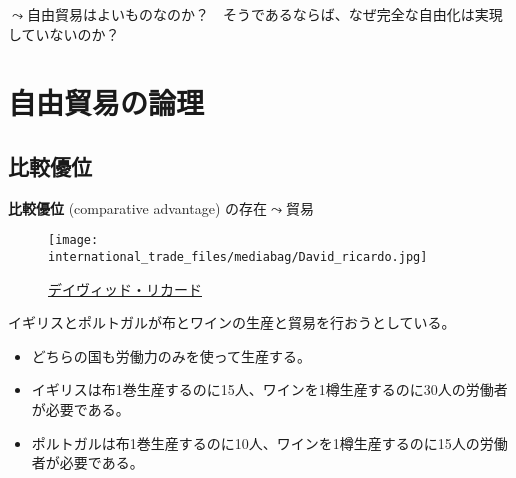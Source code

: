 \documentclass[
  xelatex,
  ja=standard]{bxjsarticle}
\providecommand{\tightlist}{%
  \setlength{\itemsep}{0pt}\setlength{\parskip}{0pt}}\usepackage{longtable,booktabs,array}
\begin{document}
\(\leadsto\)自由貿易はよいものなのか？　そうであるならば、なぜ完全な自由化は実現していないのか？

\hypertarget{ux81eaux7531ux8cbfux6613ux306eux8ad6ux7406}{%
\section{自由貿易の論理}\label{ux81eaux7531ux8cbfux6613ux306eux8ad6ux7406}}

\hypertarget{ux6bd4ux8f03ux512aux4f4d}{%
\subsection{比較優位}\label{ux6bd4ux8f03ux512aux4f4d}}

\textbf{比較優位} (comparative advantage) の存在\(\leadsto\)貿易

\begin{figure}[htpb]

{\centering \texttt{[image: international\_trade\_files/mediabag/David\_ricardo.jpg]}

}

\caption{\href{https://commons.wikimedia.org/wiki/File:David_ricardo.jpg}{デイヴィッド・リカード}}

\end{figure}

\begin{tcolorbox}[enhanced jigsaw, left=2mm, colframe=quarto-callout-tip-color-frame, colback=white, coltitle=black, rightrule=.15mm, title=\textcolor{quarto-callout-tip-color}{\faLightbulb}\hspace{0.5em}{イギリスとポルトガルの貿易}, arc=.35mm, toprule=.15mm, bottomrule=.15mm, leftrule=.75mm, bottomtitle=1mm, toptitle=1mm, titlerule=0mm, breakable, opacitybacktitle=0.6, colbacktitle=quarto-callout-tip-color!10!white, opacityback=0]

イギリスとポルトガルが布とワインの生産と貿易を行おうとしている。

\begin{itemize}
\tightlist
\item
  どちらの国も労働力のみを使って生産する。
\item
  イギリスは布1巻生産するのに15人、ワインを1樽生産するのに30人の労働者が必要である。
\item
  ポルトガルは布1巻生産するのに10人、ワインを1樽生産するのに15人の労働者が必要である。
\end{itemize}

\end{tcolorbox}
\end{document}
